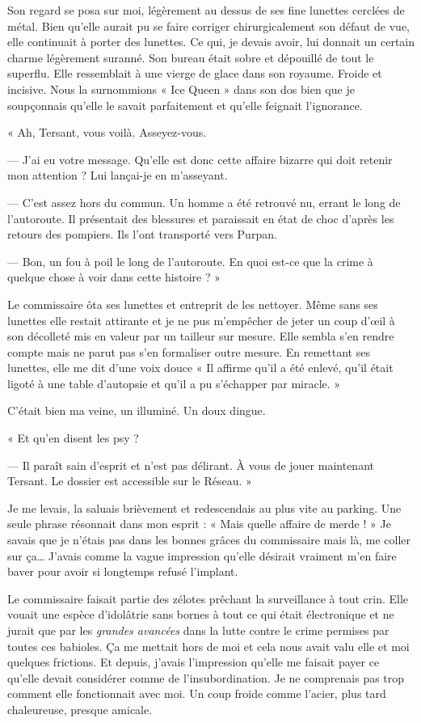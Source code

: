 Son regard se posa sur moi, légèrement au dessus de ses fine lunettes cerclées
de métal. Bien qu'elle aurait pu se faire corriger chirurgicalement son défaut
de vue, elle continuait à porter des lunettes. Ce qui, je devais avoir, lui
donnait un certain charme légèrement suranné. Son bureau était sobre et
dépouillé de tout le superflu. Elle ressemblait à une vierge de glace dans son
royaume. Froide et incisive. Nous la surnommions « Ice Queen » dans son dos bien
que je soupçonnais qu'elle le savait parfaitement et qu'elle feignait
l'ignorance.

« Ah, Tersant, vous voilà. Asseyez-vous.

— J'ai eu votre message. Qu'elle est donc cette affaire bizarre qui doit
retenir mon attention ? Lui lançai-je en m'asseyant.

— C'est assez hors du commun. Un homme a été retrouvé nu, errant le long de
l'autoroute. Il présentait des blessures et paraissait en état de choc d'après
les retours des pompiers. Ils l'ont transporté vers Purpan.

— Bon, un fou à poil le long de l'autoroute. En quoi est-ce que la crime à
quelque chose à voir dans cette histoire ? »

Le commissaire ôta ses lunettes et entreprit de les nettoyer. Même sans ses
lunettes elle restait attirante et je ne pus m'empêcher de jeter un coup d'œil
à son décolleté mis en valeur par un tailleur sur mesure. Elle sembla s'en
rendre compte mais ne parut pas s'en formaliser outre mesure. En remettant ses
lunettes, elle me dit d'une voix douce « Il affirme qu'il a été enlevé, qu'il
était ligoté à une table d'autopsie et qu'il a pu s'échapper par miracle. »

C'était bien ma veine, un illuminé. Un doux dingue.

« Et qu'en disent les psy ?

— Il paraît sain d'esprit et n'est pas délirant. À vous de jouer maintenant
Tersant. Le dossier est accessible sur le Réseau. »

Je me levais, la saluais brièvement et redescendais au plus vite au parking.
Une seule phrase résonnait dans mon esprit : « Mais quelle affaire de merde ! »
Je savais que je n'étais pas dans les bonnes grâces du commissaire mais là, me
coller sur ça… J'avais comme la vague impression qu'elle désirait vraiment m'en
faire baver pour avoir si longtemps refusé l'implant.

Le commissaire faisait partie des zélotes prêchant la surveillance à tout crin.
Elle vouait une espèce d'idolâtrie sans bornes à tout ce qui était électronique
et ne jurait que par les \emph{grandes avancées} dans la lutte contre le crime
permises par toutes ces babioles. Ça me mettait hors de moi et cela nous avait
valu elle et moi quelques frictions. Et depuis, j'avais l'impression qu'elle me
faisait payer ce qu'elle devait considérer comme de l'insubordination. Je ne
comprenais pas trop comment elle fonctionnait avec moi. Un coup froide comme
l'acier, plus tard chaleureuse, presque amicale.

